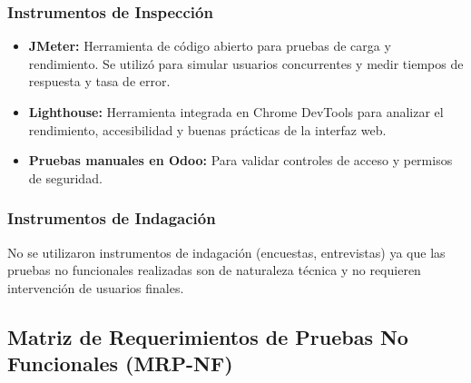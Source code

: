 \documentclass[12pt, letterpaper]{article}
\begin{document}
\subsubsection{Instrumentos de Inspección}
\begin{itemize}
    \item \textbf{JMeter:} Herramienta de código abierto para pruebas de carga y rendimiento. Se utilizó para simular usuarios concurrentes y medir tiempos de respuesta y tasa de error.
    \item \textbf{Lighthouse:} Herramienta integrada en Chrome DevTools para analizar el rendimiento, accesibilidad y buenas prácticas de la interfaz web.
    \item \textbf{Pruebas manuales en Odoo:} Para validar controles de acceso y permisos de seguridad.
\end{itemize}

\subsubsection{Instrumentos de Indagación}
No se utilizaron instrumentos de indagación (encuestas, entrevistas) ya que las pruebas no funcionales realizadas son de naturaleza técnica y no requieren intervención de usuarios finales.

\subsection{Matriz de Requerimientos de Pruebas No Funcionales (MRP-NF)}
\end{document}
